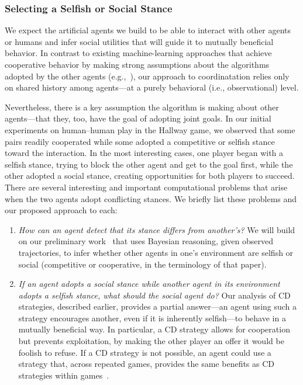 
\subsubsection*{\large Selecting a Selfish or Social Stance}
\label{sec:stance}

We expect the artificial agents we build to be able to interact
with other agents or humans and infer social utilities that will guide
it to mutually beneficial behavior.  In contrast to existing
machine-learning approaches that achieve cooperative behavior by
making strong assumptions about the algorithms adopted by the other
agents (e.g.,~\cite{conitzer07}), our approach to coordinatation
relies only on shared history among agents---at a purely behavioral
(i.e., observational) level.

Nevertheless, there is a key assumption the algorithm is making about
other agents---that they, too, have the goal of adopting joint
goals.  In our initial experiments on human--human play in the Hallway
game, we observed that some pairs readily cooperated while some
adopted a competitive or selfish stance toward the interaction.  In the
most interesting cases, one player began with a selfish stance, trying
to block the other agent and get to the goal first, while the other
adopted a social stance, creating opportunities for both players to
succeed.  There are several interesting and important computational
problems that arise when the two agents adopt conflicting stances.  We
briefly list these problems and our proposed approach to each:

\begin{enumerate}

\item \emph{How can an agent detect that its stance differs from another's?}
  We will build on our preliminary work~\cite{kleiman16} that uses
  Bayesian reasoning, given observed trajectories, to infer whether
  other agents in one's environment are selfish or social (competitive
  or cooperative, in the terminology of that paper).
  
\item \emph{If an agent adopts a social stance while another agent in 
  its environment adopts a selfish stance, what should the social
  agent do?}  Our analysis of CD strategies, described earlier,
  provides a partial answer---an agent using such a strategy
  encourages another, even if it is inherently selfish---to behave in
  a mutually beneficial way.  In particular, a CD strategy allows for
  cooperation but prevents exploitation, by making the other player an
  offer it would be foolish to refuse.  If a CD strategy is not
  possible, an agent could use a strategy that, across
  repeated games, provides the same benefits as CD strategies within
  games~\cite{munoz08}.
  
\end{enumerate}

